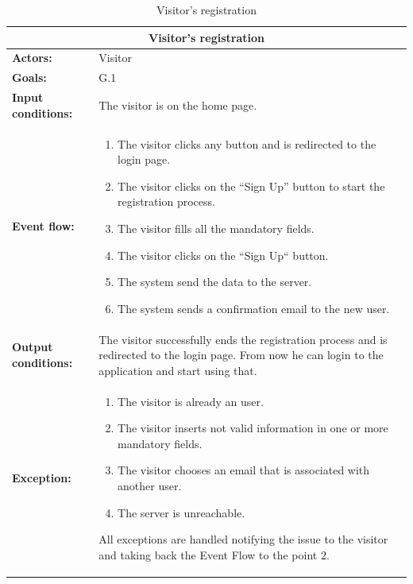 \begin{table}
\begin{tabular} { p{5cm} p{8cm} } 
\multicolumn{2}{c}{\textbf{Visitor's registration}}\\
\hline
\textbf{Actors:} & Visitor \\ 
\textbf{Goals:} & G.1 \\ 
\textbf{Input conditions:} & The visitor is on the home page. \\
\textbf{Event flow:} & \begin{enumerate}
						\item
						The visitor clicks any button and is redirected to the login page.
						\item
						The visitor clicks on the “Sign Up” button to start the registration process.
						\item
						The visitor fills all the mandatory fields.
						\item
						The visitor clicks on the “Sign Up“ button.
						\item
						The system send the data to the server.
						\item
						The system sends a confirmation email to the new user.
						\end{enumerate}\\ 
\textbf{Output conditions:} & The visitor successfully ends the registration process and is redirected to the login page. From now he can login to the application and start using that. \\ 
\textbf{Exception:} & \begin{enumerate}
						\item
						The visitor is already an user.
						\item
						The visitor inserts not valid information in one or more mandatory fields.
						\item
						The visitor chooses an email that is associated with another user.
						\item
						The server is unreachable.
					\end{enumerate}
All exceptions are handled notifying the issue to the visitor and taking back the Event Flow to the point 2. \\
\hline
\end{tabular}
\caption{Visitor's registration}
\label{ref:visitorsregistration}
\end{table}
\clearpage

